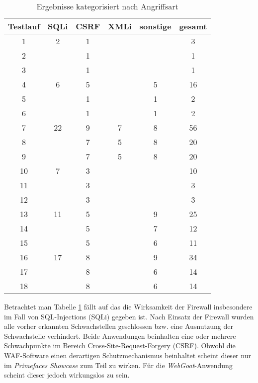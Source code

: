 \begin{table}[h]
    \centering
    \begin{tabular}{cccccc} 
      \toprule
    \textbf{Testlauf} & \textbf{SQLi} & \textbf{CSRF} & \textbf{XMLi} & \textbf{sonstige} & \textbf{gesamt} \\ 
     \midrule
      1 & 2 & 1 &  &  & 3\\
      2 &   & 1 &  &  & 1\\
      3 &   & 1 &  &  & 1\\
      4 & 6 & 5 &  & 5 & 16\\
      5 &   & 1 &  & 1  & 2 \\
      6 &   & 1 &  & 1  & 2 \\
      7 & 22 & 9 & 7 & 8& 56\\
      8 &  & 7 & 5 & 8 & 20 \\
      9 &  & 7 & 5 & 8 & 20 \\
      10 & 7 & 3 &  &  &  10  \\ 
      11 &  & 3 &  & & 3  \\
      12 &  & 3 &  & & 3  \\
      13 & 11 & 5 &  & 9 & 25 \\ 
      14 &   & 5 &  & 7  & 12 \\
      15 &   & 5 &  & 6  & 11 \\
      16 & 17 & 8 &  & 9 & 34  \\ 
      17 &  & 8 &  & 6 & 14 \\
      18 &  & 8 &  & 6 & 14 \\
   \bottomrule
    \end{tabular}
    \caption{Ergebnisse kategorisiert nach Angriffsart}
    \label{tab:tes2tergebnisse}
\end{table}

Betrachtet man Tabelle \ref{tab:tes2tergebnisse} fällt auf das die Wirksamkeit der Firewall insbesondere im Fall von SQL-Injections (SQLi) gegeben ist. Nach Einsatz der Firewall wurden alle vorher erkannten Schwachstellen geschlossen bzw. eine Ausnutzung der Schwachstelle verhindert. Beide Anwendungen beinhalten eine oder mehrere Schwachpunkte im Bereich Cross-Site-Request-Forgery (CSRF). Obwohl die WAF-Software einen derartigen Schutzmechanismus beinhaltet scheint dieser nur im \emph{Primefaces Showcase} zum Teil zu wirken. Für die \emph{WebGoat}-Anwendung scheint dieser jedoch wirkungslos zu sein.\\



